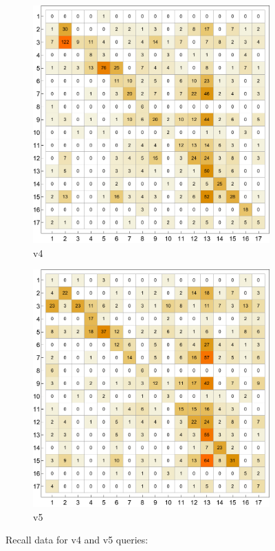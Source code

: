 \documentclass{article}
\begin{document}
\begin{figure}[H]
    \centering
         \begin{subfigure}{0.49\textwidth}
                     \centering
            \includegraphics[width=\textwidth]{figures/recallmatrixv4.pdf}
            \caption{v4}
            \label{subfig1}
        \end{subfigure}
             \hfill
         \begin{subfigure}{0.49\textwidth}
                     \centering
            \includegraphics[width=\textwidth]{figures/recallmatrixv5.pdf}
            \caption{v5}
            \label{subfig2}
        \end{subfigure}
        \caption{Recall data for v4 and v5 queries:}
\end{figure}
\end{document}
